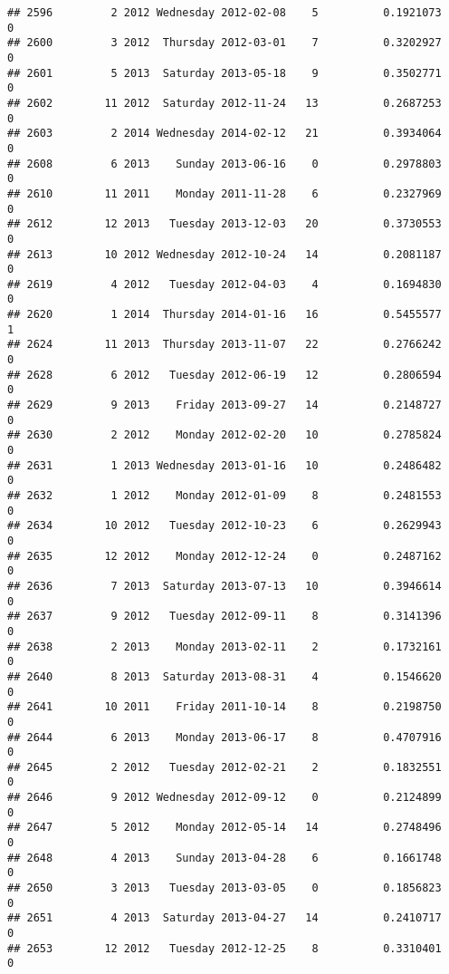 \documentclass[
]{article}
\begin{document}
\begin{verbatim}
## 2596         2 2012 Wednesday 2012-02-08    5          0.1921073             0
## 2600         3 2012  Thursday 2012-03-01    7          0.3202927             0
## 2601         5 2013  Saturday 2013-05-18    9          0.3502771             0
## 2602        11 2012  Saturday 2012-11-24   13          0.2687253             0
## 2603         2 2014 Wednesday 2014-02-12   21          0.3934064             0
## 2608         6 2013    Sunday 2013-06-16    0          0.2978803             0
## 2610        11 2011    Monday 2011-11-28    6          0.2327969             0
## 2612        12 2013   Tuesday 2013-12-03   20          0.3730553             0
## 2613        10 2012 Wednesday 2012-10-24   14          0.2081187             0
## 2619         4 2012   Tuesday 2012-04-03    4          0.1694830             0
## 2620         1 2014  Thursday 2014-01-16   16          0.5455577             1
## 2624        11 2013  Thursday 2013-11-07   22          0.2766242             0
## 2628         6 2012   Tuesday 2012-06-19   12          0.2806594             0
## 2629         9 2013    Friday 2013-09-27   14          0.2148727             0
## 2630         2 2012    Monday 2012-02-20   10          0.2785824             0
## 2631         1 2013 Wednesday 2013-01-16   10          0.2486482             0
## 2632         1 2012    Monday 2012-01-09    8          0.2481553             0
## 2634        10 2012   Tuesday 2012-10-23    6          0.2629943             0
## 2635        12 2012    Monday 2012-12-24    0          0.2487162             0
## 2636         7 2013  Saturday 2013-07-13   10          0.3946614             0
## 2637         9 2012   Tuesday 2012-09-11    8          0.3141396             0
## 2638         2 2013    Monday 2013-02-11    2          0.1732161             0
## 2640         8 2013  Saturday 2013-08-31    4          0.1546620             0
## 2641        10 2011    Friday 2011-10-14    8          0.2198750             0
## 2644         6 2013    Monday 2013-06-17    8          0.4707916             0
## 2645         2 2012   Tuesday 2012-02-21    2          0.1832551             0
## 2646         9 2012 Wednesday 2012-09-12    0          0.2124899             0
## 2647         5 2012    Monday 2012-05-14   14          0.2748496             0
## 2648         4 2013    Sunday 2013-04-28    6          0.1661748             0
## 2650         3 2013   Tuesday 2013-03-05    0          0.1856823             0
## 2651         4 2013  Saturday 2013-04-27   14          0.2410717             0
## 2653        12 2012   Tuesday 2012-12-25    8          0.3310401             0

\end{verbatim}
\end{document}
